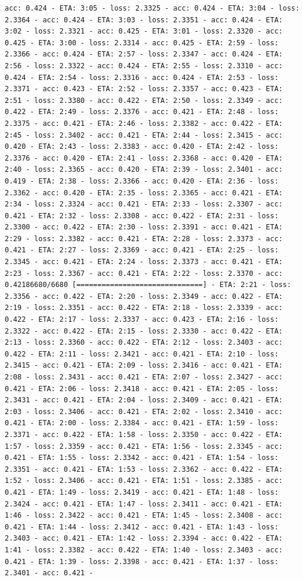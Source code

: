 \documentclass[11pt]{article}
\begin{document}
\begin{Verbatim}[commandchars=\\\{\}]
acc: 0.424 - ETA: 3:05 - loss: 2.3325 - acc: 0.424 - ETA: 3:04 - loss: 2.3364 - acc: 0.424 - ETA: 3:03 - loss: 2.3351 - acc: 0.424 - ETA: 3:02 - loss: 2.3321 - acc: 0.425 - ETA: 3:01 - loss: 2.3320 - acc: 0.425 - ETA: 3:00 - loss: 2.3314 - acc: 0.425 - ETA: 2:59 - loss: 2.3366 - acc: 0.424 - ETA: 2:57 - loss: 2.3347 - acc: 0.424 - ETA: 2:56 - loss: 2.3322 - acc: 0.424 - ETA: 2:55 - loss: 2.3310 - acc: 0.424 - ETA: 2:54 - loss: 2.3316 - acc: 0.424 - ETA: 2:53 - loss: 2.3371 - acc: 0.423 - ETA: 2:52 - loss: 2.3357 - acc: 0.423 - ETA: 2:51 - loss: 2.3380 - acc: 0.422 - ETA: 2:50 - loss: 2.3349 - acc: 0.422 - ETA: 2:49 - loss: 2.3376 - acc: 0.421 - ETA: 2:48 - loss: 2.3375 - acc: 0.421 - ETA: 2:46 - loss: 2.3382 - acc: 0.422 - ETA: 2:45 - loss: 2.3402 - acc: 0.421 - ETA: 2:44 - loss: 2.3415 - acc: 0.420 - ETA: 2:43 - loss: 2.3383 - acc: 0.420 - ETA: 2:42 - loss: 2.3376 - acc: 0.420 - ETA: 2:41 - loss: 2.3368 - acc: 0.420 - ETA: 2:40 - loss: 2.3365 - acc: 0.420 - ETA: 2:39 - loss: 2.3401 - acc: 0.419 - ETA: 2:38 - loss: 2.3366 - acc: 0.420 - ETA: 2:36 - loss: 2.3362 - acc: 0.420 - ETA: 2:35 - loss: 2.3365 - acc: 0.421 - ETA: 2:34 - loss: 2.3324 - acc: 0.421 - ETA: 2:33 - loss: 2.3307 - acc: 0.421 - ETA: 2:32 - loss: 2.3308 - acc: 0.422 - ETA: 2:31 - loss: 2.3300 - acc: 0.422 - ETA: 2:30 - loss: 2.3391 - acc: 0.421 - ETA: 2:29 - loss: 2.3382 - acc: 0.421 - ETA: 2:28 - loss: 2.3373 - acc: 0.421 - ETA: 2:27 - loss: 2.3369 - acc: 0.421 - ETA: 2:25 - loss: 2.3345 - acc: 0.421 - ETA: 2:24 - loss: 2.3373 - acc: 0.421 - ETA: 2:23 - loss: 2.3367 - acc: 0.421 - ETA: 2:22 - loss: 2.3370 - acc: 0.42186680/6680 [==============================] - ETA: 2:21 - loss: 2.3356 - acc: 0.422 - ETA: 2:20 - loss: 2.3349 - acc: 0.422 - ETA: 2:19 - loss: 2.3351 - acc: 0.422 - ETA: 2:18 - loss: 2.3339 - acc: 0.422 - ETA: 2:17 - loss: 2.3337 - acc: 0.423 - ETA: 2:16 - loss: 2.3322 - acc: 0.422 - ETA: 2:15 - loss: 2.3330 - acc: 0.422 - ETA: 2:13 - loss: 2.3360 - acc: 0.422 - ETA: 2:12 - loss: 2.3403 - acc: 0.422 - ETA: 2:11 - loss: 2.3421 - acc: 0.421 - ETA: 2:10 - loss: 2.3415 - acc: 0.421 - ETA: 2:09 - loss: 2.3416 - acc: 0.421 - ETA: 2:08 - loss: 2.3431 - acc: 0.421 - ETA: 2:07 - loss: 2.3427 - acc: 0.421 - ETA: 2:06 - loss: 2.3418 - acc: 0.421 - ETA: 2:05 - loss: 2.3431 - acc: 0.421 - ETA: 2:04 - loss: 2.3409 - acc: 0.421 - ETA: 2:03 - loss: 2.3406 - acc: 0.421 - ETA: 2:02 - loss: 2.3410 - acc: 0.421 - ETA: 2:00 - loss: 2.3384 - acc: 0.421 - ETA: 1:59 - loss: 2.3371 - acc: 0.422 - ETA: 1:58 - loss: 2.3350 - acc: 0.422 - ETA: 1:57 - loss: 2.3359 - acc: 0.421 - ETA: 1:56 - loss: 2.3345 - acc: 0.421 - ETA: 1:55 - loss: 2.3342 - acc: 0.421 - ETA: 1:54 - loss: 2.3351 - acc: 0.421 - ETA: 1:53 - loss: 2.3362 - acc: 0.422 - ETA: 1:52 - loss: 2.3406 - acc: 0.421 - ETA: 1:51 - loss: 2.3385 - acc: 0.421 - ETA: 1:49 - loss: 2.3419 - acc: 0.421 - ETA: 1:48 - loss: 2.3424 - acc: 0.421 - ETA: 1:47 - loss: 2.3411 - acc: 0.421 - ETA: 1:46 - loss: 2.3422 - acc: 0.421 - ETA: 1:45 - loss: 2.3408 - acc: 0.421 - ETA: 1:44 - loss: 2.3412 - acc: 0.421 - ETA: 1:43 - loss: 2.3403 - acc: 0.421 - ETA: 1:42 - loss: 2.3394 - acc: 0.422 - ETA: 1:41 - loss: 2.3382 - acc: 0.422 - ETA: 1:40 - loss: 2.3403 - acc: 0.421 - ETA: 1:39 - loss: 2.3398 - acc: 0.421 - ETA: 1:37 - loss: 2.3401 - acc: 0.421 - 
\end{Verbatim}
\end{document}
